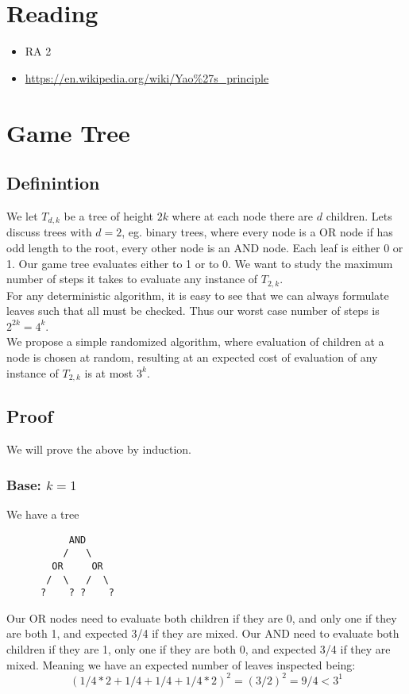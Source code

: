 \documentclass[a4paper, fleqn]{article}
\begin{document}
\section*{Reading}
\begin{itemize}
    \item RA 2
    \item \url{https://en.wikipedia.org/wiki/Yao\%27s\_principle}
\end{itemize}
\tableofcontents
\section{Game Tree}
\subsection{Definintion}
We let $T_{d,k}$ be a tree of height $2k$ where at each node there are $d$ children. Lets discuss trees with $d=2$, eg. binary trees, where every node is a OR node if has odd length to the root, every other node is an AND node. Each leaf is either 0 or 1. Our game tree evaluates either to 1 or to 0. We want to study the maximum number of steps it takes to evaluate any instance of $T_{2,k}$.\\
For any deterministic algorithm, it is easy to see that we can always formulate leaves such that all must be checked. Thus our worst case number of steps is $2^{2k} = 4^k$.\\
We propose a simple randomized algorithm, where evaluation of children at a node is chosen at random, resulting at an expected cost of evaluation of any instance of $T_{2,k}$ is at most $3^k$.
\subsection{Proof}
We will prove the above by induction.
\subsubsection*{Base: $k=1$}
We have a tree
\begin{verbatim}
           AND
          /   \
        OR     OR
       /  \   /  \
      ?    ? ?    ?
\end{verbatim}
Our OR nodes need to evaluate both children if they are 0, and only one if they are both 1, and expected 3/4 if they are mixed.
Our AND need to evaluate both children if they are 1, only one if they are both 0, and expected 3/4 if they are mixed.
Meaning we have an expected number of leaves inspected being:
$$
 (1/4 * 2 + 1/4 + 1/4 + 1/4 * 2)^2 = (3/2)^2 = 9/4 < 3^1
$$
\end{document}
